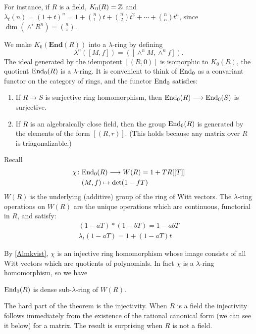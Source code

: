 For instance, if $R$ is a field, $K_0(R)=\mathbb{Z}$ and $\lambda_t(n)=(1+t)^n=1+\binom{n}{1}t+\binom{n}{2}t^2+\cdots+\binom{n}{n}t^n$, since $\dim (\wedge^i R^n)=\binom{n}{i}$.

We make $K_0(\mathbf{End}(R))$ into a $\lambda$-ring by defining
\[\lambda^n([M, f])=([\wedge^n M,\wedge^n f]).\]
The ideal generated by the idempotent $[(R,0)]$ is isomorphic to $K_0(R)$, the quotient $\mathrm{End}_0(R)$ is a $\lambda$-ring. It is convenient to think of $\mathrm{End}_0$ as a convariant functor on the category of rings, and the functor $\mathrm{End}_0$ satisfies:
\begin{enumerate}
	\item If $R\longrightarrow S$ is surjective ring homomorphism, then $\mathrm{End}_0(R)\longrightarrow \mathrm{End}_0(S)$ is surjective.
	\item If $R$ is an algebraically close field, then the group $\mathrm{End}_0(R)$ is generated by the elements of the form $[(R,r)]$. (This holds because any matrix over $R$ is triagonalizable.)
\end{enumerate}

Recall 
\begin{align*}
	\chi \colon&  \mathrm{End}_0(R)\longrightarrow W(R)=1+TR[[T]]\\
     & (M,f) \mapsto \det(1-fT)
\end{align*}
$W(R)$ is the underlying (additive) group of the ring of Witt vectors. The $\lambda$-ring operations on $W(R)$ are the unique operations which are continuous, functorial in $R$, and satisfy:
\begin{gather*}
	(1-aT)*(1-bT)=1-abT\\
	\lambda_t(1-aT)=1+(1-aT)t
\end{gather*}

By \ref{Almkvist}, $\chi$ is an injective ring homomorphism whose image consists of all Witt vectors which are quotients of polynomials. In fact $\chi$ is a $\lambda$-ring homomorphism, so we have
\begin{theorem}
	$\mathrm{End}_0(R)$ is dense sub-$\lambda$-ring of $W(R)$.
\end{theorem}
	The hard part of the theorem is the injectivity. When $R$ is a field the injectivity follows immediately from the existence of the rational canonical form (we can see it below) for a matrix. The result is surprising when $R$ is not a field.
